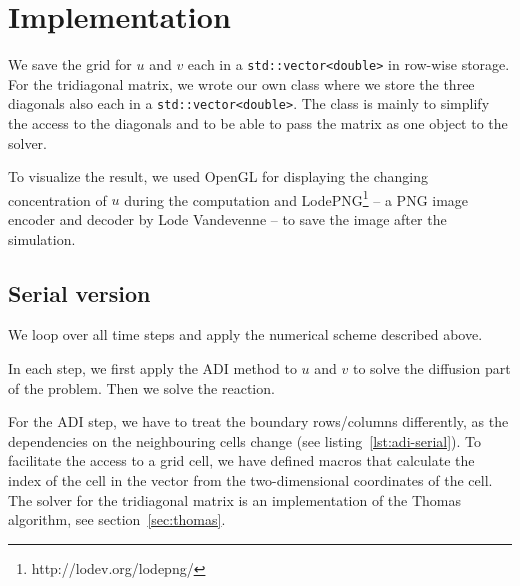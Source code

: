 \documentclass[a4paper]{article}
\begin{document}
\section{Implementation}

We save the grid for $u$ and $v$ each in a \verb+std::vector<double>+ in row-wise storage.
For the tridiagonal matrix, we wrote our own class where we store the three diagonals also each in a \verb+std::vector<double>+.
The class is mainly to simplify the access to the diagonals and to be able to pass the matrix as one object to the solver.

To visualize the result, we used OpenGL for displaying the changing concentration of $u$ during the computation and LodePNG\footnote{http://lodev.org/lodepng/} -- a PNG image encoder and decoder by Lode Vandevenne -- to save the image after the simulation.

\subsection{Serial version}

We loop over all time steps and apply the numerical scheme described above.



In each step, we first apply the ADI method to $u$ and $v$ to solve the diffusion part of the problem.
Then we solve the reaction.

For the ADI step, we have to treat the boundary rows/columns differently, as the dependencies on the neighbouring cells change (see listing~\ref{lst:adi-serial}).
To facilitate the access to a grid cell, we have defined macros that calculate the index of the cell in the vector from the two-dimensional coordinates of the cell.
The solver for the tridiagonal matrix is an implementation of the Thomas algorithm, see section~\ref{sec:thomas}.
\end{document}
